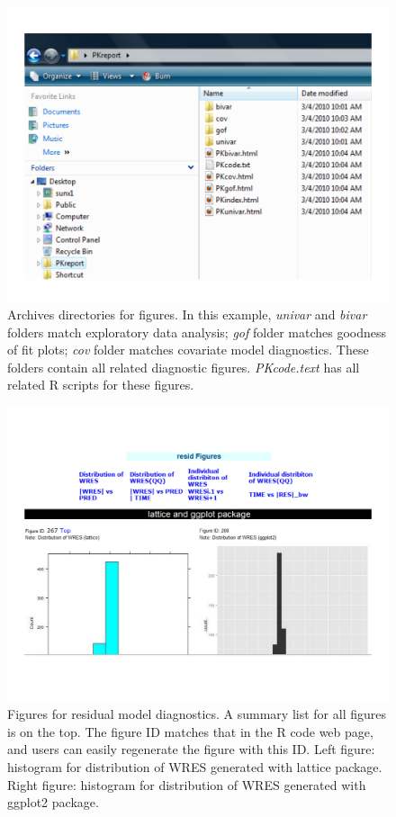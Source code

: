 \documentclass[a4paper]{article}
\begin{document}
\begin{figure}[h!tb] \centering
\includegraphics[scale=0.5]{c2_s2_4dir.pdf}
\caption{Archives directories for figures. In this example, \textit{univar} and \textit{bivar} folders match exploratory data analysis; \textit{gof} folder matches goodness of fit plots; \textit{cov} folder matches covariate model diagnostics. These folders contain all related diagnostic figures. \textit{PKcode.text} has all related R scripts for these figures.}
\label{c2_s2_4dir}
\end{figure}

\begin{figure}[h!tb] \centering
\includegraphics[scale=0.5]{c2_s2_3fig.pdf}
\caption{Figures for residual model diagnostics. A summary list for all figures is on the top. The figure ID matches that in the R code web page, and users can
easily regenerate the figure with this ID. Left figure: histogram for distribution of WRES generated with lattice package. Right figure: histogram for distribution of
WRES generated with ggplot2 package.}
\label{c2_s2_3fig}
\end{figure}
\end{document}
